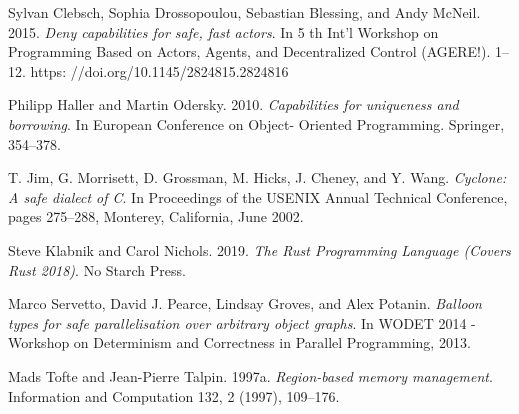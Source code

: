 \documentclass{nsf-grfp}
\begin{document}
\begin{thebibliography}{9}

Sylvan Clebsch, Sophia Drossopoulou, Sebastian Blessing, and Andy McNeil. 2015. \textit{Deny capabilities for safe, fast actors}.
In 5 th Int’l Workshop on Programming Based on Actors, Agents, and Decentralized Control (AGERE!). 1–12. https:
//doi.org/10.1145/2824815.2824816



Philipp Haller and Martin Odersky. 2010. \textit{Capabilities for uniqueness and borrowing}. In European Conference on Object-
Oriented Programming. Springer, 354–378.

T. Jim, G. Morrisett, D. Grossman, M. Hicks, J. Cheney, and
Y. Wang. \textit{Cyclone: A safe dialect of C}. In Proceedings of the
USENIX Annual Technical Conference, pages 275–288,
Monterey, California, June 2002.

Steve Klabnik and Carol Nichols. 2019. \textit{The Rust Programming Language (Covers Rust 2018)}. No Starch Press.

Marco Servetto, David J. Pearce, Lindsay Groves, and Alex Potanin. \textit{Balloon types for safe
parallelisation over arbitrary object graphs}. In WODET 2014 - Workshop on Determinism and
Correctness in Parallel Programming, 2013.

Mads Tofte and Jean-Pierre Talpin. 1997a. \textit{Region-based memory management}. Information and Computation 132, 2 (1997),
109–176.

\end{thebibliography}
\end{document}
